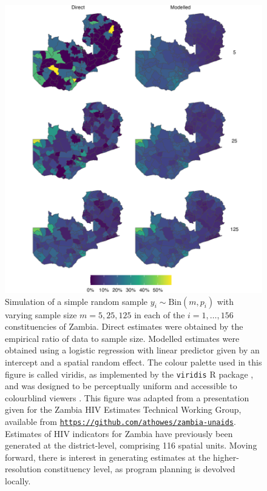 \documentclass[a4paper, nobind]{templates/ociamthesis}
\begin{document}
\begin{figure}
\includegraphics[width=0.95\linewidth]{figures/bayesian/zmb-maps} \caption{Simulation of a simple random sample \(y_i \sim \text{Bin}(m, p_i)\) with varying sample size \(m = 5, 25, 125\) in each of the \(i = 1, \ldots, 156\) constituencies of Zambia. Direct estimates were obtained by the empirical ratio of data to sample size. Modelled estimates were obtained using a logistic regression with linear predictor given by an intercept and a spatial random effect. The colour palette used in this figure is called viridis, as implemented by the \texttt{viridis} R package \autocite{viridis}, and was designed to be perceptually uniform and accessible to colourblind viewers \autocite{smith2015better}. This figure was adapted from a presentation given for the Zambia HIV Estimates Technical Working Group, available from \href{https://github.com/athowes/zambia-unaids}{\texttt{https://github.com/athowes/zambia-unaids}}. Estimates of HIV indicators for Zambia have previously been generated at the district-level, comprising 116 spatial units. Moving forward, there is interest in generating estimates at the higher-resolution constituency level, as program planning is devolved locally.}\label{fig:zmb-maps}
\end{figure}
\end{document}
